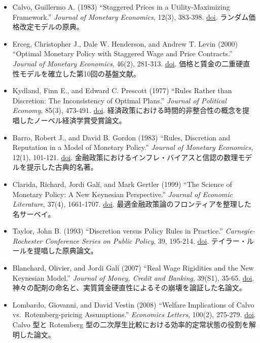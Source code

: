 \documentclass[
  japanese,
  lualatex,
  ja=standard,
  12pt,
  a4paper]{ltjsarticle}
\providecommand{\tightlist}{%
  \setlength{\itemsep}{0pt}\setlength{\parskip}{0pt}}
\begin{document}
\begin{itemize}
\tightlist
\item
  Calvo, Guillermo A. (1983) ``Staggered Prices in a Utility-Maximizing
  Framework.'' \emph{Journal of Monetary Economics}, 12(3), 383-398.
  \href{https://doi.org/10.1016/0304-3932(83)90060-0}{doi}.
  ランダム価格改定モデルの原典。
\item
  Erceg, Christopher J., Dale W. Henderson, and Andrew T. Levin (2000)
  ``Optimal Monetary Policy with Staggered Wage and Price Contracts.''
  \emph{Journal of Monetary Economics}, 46(2), 281-313.
  \href{https://doi.org/10.1016/S0304-3932(00)00028-3}{doi}.
  価格と賃金の二重硬直性モデルを確立した第10回の基盤文献。
\item
  Kydland, Finn E., and Edward C. Prescott (1977) ``Rules Rather than
  Discretion: The Inconsistency of Optimal Plans.'' \emph{Journal of
  Political Economy}, 85(3), 473-491.
  \href{https://doi.org/10.1086/260580}{doi}.
  経済政策における時間的非整合性の概念を提唱したノーベル経済学賞受賞論文。
\item
  Barro, Robert J., and David B. Gordon (1983) ``Rules, Discretion and
  Reputation in a Model of Monetary Policy.'' \emph{Journal of Monetary
  Economics}, 12(1), 101-121.
  \href{https://doi.org/10.1016/0304-3932(83)90051-X}{doi}.
  金融政策におけるインフレ・バイアスと信認の数理モデルを提示した古典的名著。
\item
  Clarida, Richard, Jordi Galí, and Mark Gertler (1999) ``The Science of
  Monetary Policy: A New Keynesian Perspective.'' \emph{Journal of
  Economic Literature}, 37(4), 1661-1707.
  \href{https://doi.org/10.1257/jel.37.4.1661}{doi}.
  最適金融政策論のフロンティアを整理した名サーベイ。
\item
  Taylor, John B. (1993) ``Discretion versus Policy Rules in Practice.''
  \emph{Carnegie-Rochester Conference Series on Public Policy}, 39,
  195-214. \href{https://doi.org/10.1016/0167-2231(93)90009-L}{doi}.
  テイラー・ルールを提唱した原典論文。
\item
  Blanchard, Olivier, and Jordi Galí (2007) ``Real Wage Rigidities and
  the New Keynesian Model.'' \emph{Journal of Money, Credit and
  Banking}, 39(S1), 35-65.
  \href{https://doi.org/10.1111/j.1538-4616.2007.00015.x}{doi}.
  神々の配剤の命名と、実質賃金硬直性によるその崩壊を論証した名論文。
\item
  Lombardo, Giovanni, and David Vestin (2008) ``Welfare Implications of
  Calvo vs.~Rotemberg-pricing Assumptions.'' \emph{Economics Letters},
  100(2), 275-279.
  \href{https://doi.org/10.1016/j.econlet.2008.02.008}{doi}. Calvo 型と
  Rotemberg 型の二次厚生比較における効率的定常状態の役割を解明した論文。
\end{itemize}
\end{document}
